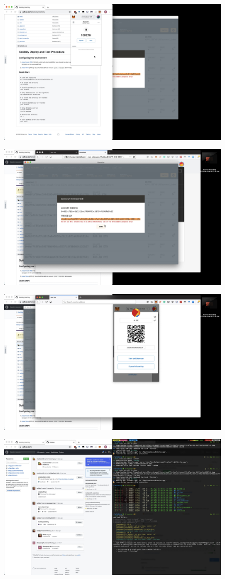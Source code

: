 \documentclass[12pt]{article}
\renewcommand{\_}{\kern-1.5pt\textunderscore\kern-1.5pt}
\begin{document}
\begin{enumerate}
	      \includegraphics[height=7cm]{graphs/11. metamask_setup_bob}

	      \includegraphics[height=7cm]{graphs/12. metamask_setup_alice}

	      \includegraphics[height=7cm]{graphs/13. metamask_setup_alice}

	      \includegraphics[height=7cm]{graphs/14. yarn_start}


\end{enumerate}
\end{document}

